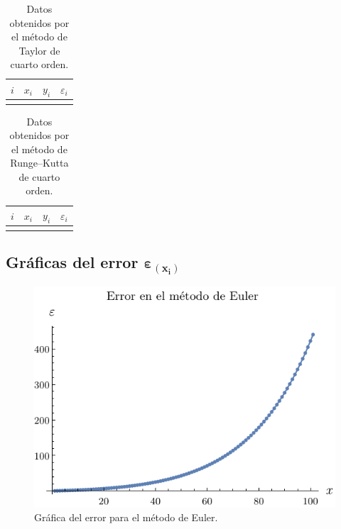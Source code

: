 \documentclass[
    english, spanish, Ce-table, Ce-theorem
]{CabesHW}
\begin{document}
\begin{table}[H]
    \centering
    \begin{tabular}{c|ccc}
    $i$ & $x_i$ & $y_i$ & $\varepsilon_i$\\[.1em]
    \hline\\[-.9em]
    
    \end{tabular}
    \caption{Datos obtenidos por el método de Taylor de cuarto orden.}
    \label{tab:taylor}
\end{table}

\begin{table}[H]
    \centering
    \begin{tabular}{c|ccc}
    $i$ & $x_i$ & $y_i$ & $\varepsilon_i$\\[.1em]
    \hline\\[-.9em]
    
    \end{tabular}
    \caption{Datos obtenidos por el método de Runge--Kutta de cuarto orden.}
    \label{tab:runge-kutta}
\end{table}

\vspace{2em}
\subsection[Gráficas del error]{Gráficas del error $\boldsymbol{\varepsilon_{(x_i)}}$}
\begin{figure}[H]
    \centering
    \includegraphics{imgs/plot-euler.pdf}
    \caption{Gráfica del error para el método de Euler.}
    \label{fig:euler}
\end{figure}
\end{document}
